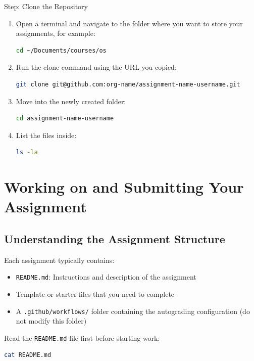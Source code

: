 \documentclass[
    a4paper,
    11pt,
    parskip=half
]{scrartcl}
\begin{document}
\begin{stepbox}{Step: Clone the Repository}
\begin{enumerate}
    \item Open a terminal and navigate to the folder where you want to store your assignments, for example:
\begin{lstlisting}[language=bash]
cd ~/Documents/courses/os
\end{lstlisting}
    \item Run the clone command using the URL you copied:
\begin{lstlisting}[language=bash]
git clone git@github.com:org-name/assignment-name-username.git
\end{lstlisting}
    \item Move into the newly created folder:
\begin{lstlisting}[language=bash]
cd assignment-name-username
\end{lstlisting}
    \item List the files inside:
\begin{lstlisting}[language=bash]
ls -la
\end{lstlisting}
\end{enumerate}
\end{stepbox}

\section{Working on and Submitting Your Assignment}
\label{sec:submit}

\subsection{Understanding the Assignment Structure}

Each assignment typically contains:
\begin{itemize}
    \item \texttt{README.md}: Instructions and description of the assignment
    \item Template or starter files that you need to complete
    \item A \texttt{.github/workflows/} folder containing the autograding configuration (do not modify this folder)
\end{itemize}

Read the \texttt{README.md} file first before starting work:
\begin{lstlisting}[language=bash]
cat README.md
\end{lstlisting}
\end{document}
